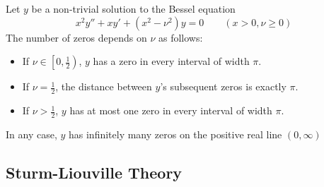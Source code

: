 \documentclass[11pt, a4paper]{article}
\begin{document}
Let $ y $ be a non-trivial solution to the Bessel equation
\begin{equation*}
	x^2 y'' + xy' + (x^2 - \nu^2)y = 0 \qquad (x > 0, \nu \geq 0)
\end{equation*}
The number of zeros depends on $ \nu $ as follows:
\begin{itemize}
	\item If $ \nu \in \left [0, \frac{1}{2}\right ) $, $ y $ has a zero in every interval of width $ \pi $.
	
	\item If $ \nu = \frac{1}{2} $, the distance between $ y $'s subsequent zeros is exactly $ \pi $.
	
	\item If $ \nu > \frac{1}{2} $, $ y $ has at most one zero in every interval of width $ \pi $.
\end{itemize}
In any case, $ y $ has infinitely many zeros on the positive real line $ (0, \infty) $



\subsection{Sturm-Liouville Theory}
\end{document}
